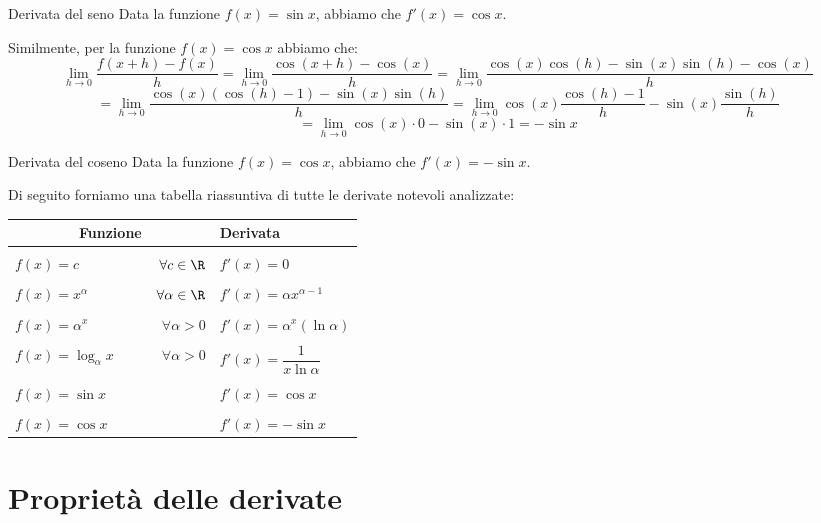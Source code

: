 \documentclass[a4paper, 12pt]{report}
\begin{document}
    \begin{framedprop}{Derivata del seno}
        Data la funzione $f(x) = \sin x$, abbiamo che $f'(x) = \cos x$.
    \end{framedprop}

    Similmente, per la funzione $f(x) = \cos x$ abbiamo che:
    \[\lim_{h \to 0} \frac{f(x+h)-f(x)}{h} = \lim_{h \to 0} \frac{\cos(x+h)-\cos(x)}{h} = \lim_{h \to 0} \frac{\cos(x) \cos(h) - \sin(x)\sin(h)-\cos(x)}{h}\]
    \[= \lim_{h \to 0} \frac{\cos(x) (\cos(h) - 1) - \sin(x)\sin(h)}{h} = \lim_{h \to 0} \cos(x) \frac{\cos(h) - 1}{h} - \sin(x)\frac{\sin(h)}{h} \]
    \[= \lim_{h \to 0} \cos(x) \cdot 0 - \sin (x) \cdot 1 = -\sin x\]

    \begin{framedprop}{Derivata del coseno}
        Data la funzione $f(x) = \cos x$, abbiamo che $f'(x) = -\sin x$.
    \end{framedprop}

    Di seguito forniamo una tabella riassuntiva di tutte le derivate notevoli analizzate:
    \begin{center}
        \begin{tabular}{lr|l}
            \multicolumn{2}{c}{\textbf{Funzione}} & \textbf{Derivata} \\
            \hline
            &&\\
            $f(x) = c$ & $\qquad \forall c \in \R$ & $f'(x) = 0$ \\
            &&\\
            $f(x) = x^{\alpha} $ & $\qquad \forall \alpha \in \R$ & $f'(x) = \alpha x^{\alpha-1}$ \\
            &&\\
            $f(x) = \alpha^x $ & $\qquad \forall \alpha > 0$ & $f'(x) = \alpha^x (\ln \alpha)$ \\
            &&\\
            $f(x) = \log_{\alpha} x $ & $\qquad \forall \alpha > 0$ & $f'(x) = \dfrac{1}{x \ln \alpha}$ \\
            &&\\
            $f(x) = \sin x $ & &$f'(x) = \cos x$ \\
            &&\\
            $f(x) = \cos x $ & &$f'(x) = -\sin x$
        \end{tabular}
    \end{center}

    \newpage

    \section{Proprietà delle derivate}
\end{document}
